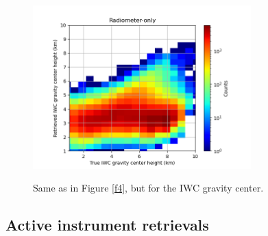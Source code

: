 \documentclass{ametsocV6.1}
\begin{document}
\begin{figure}[t]
    \centering
    \includegraphics[width=0.75\textwidth,angle=0]{fig06.rev.png}\\
    \caption{Same as in Figure \ref{f4}, but for the IWC gravity center.}\label{f6}
\end{figure}

\subsection{Active instrument retrievals}
\end{document}

